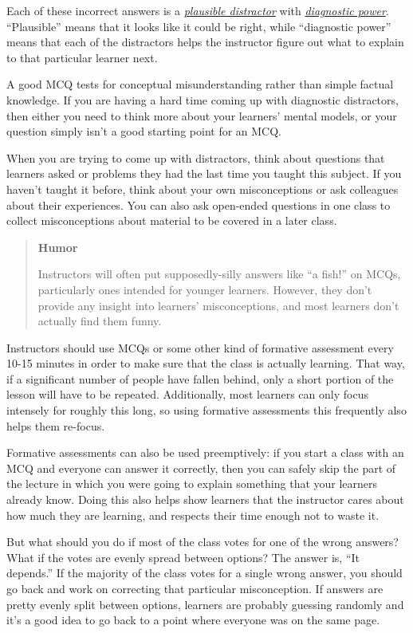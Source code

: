 \documentclass[10pt,statementpaper]{memoir}
\begin{document}
Each of these incorrect answers is a
\emph{\href{gloss.html\#plausible-distractor}{plausible distractor}}
with \emph{\href{gloss.html\#diagnostic-power}{diagnostic power}}.
``Plausible'' means that it looks like it could be right, while
``diagnostic power'' means that each of the distractors helps the
instructor figure out what to explain to that particular learner next.

A good MCQ tests for conceptual misunderstanding rather than simple
factual knowledge. If you are having a hard time coming up with
diagnostic distractors, then either you need to think more about your
learners' mental models, or your question simply isn't a good starting
point for an MCQ.

When you are trying to come up with distractors, think about questions
that learners asked or problems they had the last time you taught this
subject. If you haven't taught it before, think about your own
misconceptions or ask colleagues about their experiences. You can also
ask open-ended questions in one class to collect misconceptions about
material to be covered in a later class.

\begin{quote}
\textbf{Humor}

Instructors will often put supposedly-silly answers like ``a fish!'' on
MCQs, particularly ones intended for younger learners. However, they
don't provide any insight into learners' misconceptions, and most
learners don't actually find them funny.
\end{quote}

Instructors should use MCQs or some other kind of formative assessment
every 10-15 minutes in order to make sure that the class is actually
learning. That way, if a significant number of people have fallen
behind, only a short portion of the lesson will have to be repeated.
Additionally, most learners can only focus intensely for roughly this
long, so using formative assessments this frequently also helps them
re-focus.

Formative assessments can also be used preemptively: if you start a
class with an MCQ and everyone can answer it correctly, then you can
safely skip the part of the lecture in which you were going to explain
something that your learners already know. Doing this also helps show
learners that the instructor cares about how much they are learning, and
respects their time enough not to waste it.

But what should you do if most of the class votes for one of the wrong
answers? What if the votes are evenly spread between options? The answer
is, ``It depends.'' If the majority of the class votes for a single
wrong answer, you should go back and work on correcting that particular
misconception. If answers are pretty evenly split between options,
learners are probably guessing randomly and it's a good idea to go back
to a point where everyone was on the same page.
\end{document}
